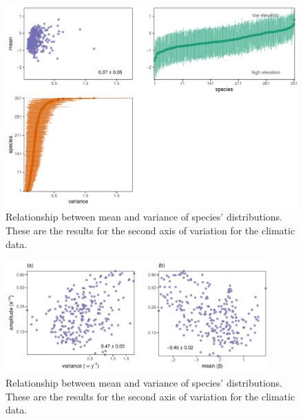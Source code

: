 \documentclass[11pt, a4paper]{article}
\begin{document}
\clearpage

\begin{figure}[h]
  \centering
    \vspace{0.5cm}
    \includegraphics[width=1\textwidth]{figures/figure1-secondaxis}
    	  \vspace{0.3cm}
	   \caption{Relationship between mean and variance of species' distributions. These are the results for the second axis of variation for the climatic data.}
      \label{sfig:secondaxis}
\end{figure}


\clearpage


\begin{figure}[h]
  \centering
    \vspace{0.5cm}
    \includegraphics[width=0.9\textwidth]{figures/alpha-vs-gamma-beta}
    	  \vspace{0.3cm}
	   \caption{Relationship between mean and variance of species' distributions. These are the results for the second axis of variation for the climatic data.}
      \label{sfig:alpha-vs-gammabeta}
\end{figure}

\clearpage
\end{document}
